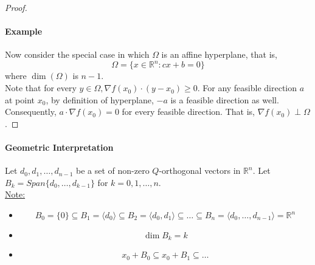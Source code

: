 \documentclass[11pt]{article}
\newcommand{\real}[0]{\mathbb{R}}
\newcommand{\under}[1]{\underline{#1}}
\begin{document}
\begin{proof}
\paragraph{Example} Now consider the special case in which $\Omega$ is an affine hyperplane, that is, 
$$\Omega = \{ x \in \real^n: cx + b = 0\}$$
where $\dim(\Omega)$ is $n-1$. \\
Note that for every $y \in \Omega, \nabla f(x_0)\cdot (y - x_0) \geq 0$. For any feasible direction $a$ at point $x_0$, by definition of hyperplane, $-a$ is a feasible direction as well. \\
Consequently, $a \cdot \nabla f(x_0) = 0$ for every feasible direction. That is, $\nabla f(x_0) \perp \Omega$.
\end{proof}

\paragraph{Geometric Interpretation}
Let $d_0, d_1, \hdots, d_{n-1}$ be a set of non-zero $Q$-orthogonal vectors in $\real^n$. Let $B_k = Span \{d_0, \hdots, d_{k-1}\}$ for $k = 0, 1, \hdots, n$. \\
\under{Note:}
\begin{itemize}
	\item $$B_0 = \{0\} \subseteq B_1 = \langle d_0 \rangle \subseteq B_2 = \langle d_0, d_1 \rangle \subseteq \hdots \subseteq B_n = \langle d_0, \hdots, d_{n-1} \rangle  = \real^n$$
	\item $$\dim B_k = k$$ 
	\item $$x_0 + B_0 \subseteq x_0 + B_1 \subseteq \hdots$$
\end{itemize}
\end{document}
